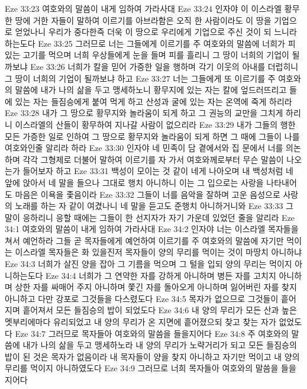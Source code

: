 Eze 33:23  여호와의 말씀이 내게 임하여 가라사대
Eze 33:24  인자야 이 이스라엘 황무한 땅에 거한 자들이 말하여 이르기를 아브라함은 오직 한 사람이라도 이 땅을 기업으로 얻었나니 우리가 중다한즉 더욱 이 땅으로 우리에게 기업으로 주신 것이 되 느니라 하는도다
Eze 33:25  그러므로 너는 그들에게 이르기를 주 여호와의 말씀에 너희가 피있는 고기를 먹으며 너희 우상들에게 눈을 들며 피를 흘리니 그 땅이 너희의 기업이 될까보냐
Eze 33:26  너희가 칼을 믿어 가증한 일을 행하며 각기 이웃의 아내를 더럽히니 그 땅이 너희의 기업이 될까보냐 하고
Eze 33:27  너는 그들에게 또 이르기를 주 여호와의 말씀에 내가 나의 삶을 두고 맹세하노니 황무지에 있는 자는 칼에 엎드러뜨리고 들에 있는 자는 들짐승에게 붙여 먹게 하고 산성과 굴에 있는 자는 온역에 죽게 하리라
Eze 33:28  내가 그 땅으로 황무지와 놀라움이 되게 하고 그 권능의 교만을 그치게 하리니 이스라엘의 산들이 황무하여 지나갈 사람이 없으리라
Eze 33:29  내가 그들의 행한 모든 가증한 일로 인하여 그 땅으로 황무지와 놀라움이 되게 하면 그 때에 그들이 나를 여호와인줄 알리라 하라
Eze 33:30  인자야 네 민족이 담 곁에서와 집 문에서 너를 의논하며 각각 그형제로 더불어 말하여 이르기를 자 가서 여호와께로부터 무슨 말씀이 나오는가 들어보자 하고
Eze 33:31  백성이 모이는 것 같이 네게 나아오며 내 백성처럼 네 앞에 앉아서 네 말을 들으나 그대로 행치 아니하니 이는 그 입으로는 사랑을 나타내어도 마음은 이욕을 좇음이라
Eze 33:32  그들이 너를 음악을 잘하며 고운 음성으로 사랑의 노래를 하는 자 같이 여겼나니 네 말을 듣고도 준행치 아니하거니와
Eze 33:33  그 말이 응하리니 응할 때에는 그들이 한 선지자가 자기 가운데 있었던 줄을 알리라
Eze 34:1  여호와의 말씀이 내게 임하여 가라사대
Eze 34:2  인자야 너는 이스라엘 목자들을 쳐서 예언하라 그들 곧 목자들에게 예언하여 이르기를 주 여호와의 말씀에 자기만 먹이는 이스라엘 목자들은 화 있을진저 목자들이 양의 무리를 먹이는 것이 마땅치 아니하냐
Eze 34:3  너희가 살진 양을 잡아 그 기름을 먹으며 그 털을 입되 양의 무리는 먹이지 아니하는도다
Eze 34:4  너희가 그 연약한 자를 강하게 아니하며 병든 자를 고치지 아니하며 상한 자를 싸매어 주지 아니하며 쫓긴 자를 돌아오게 아니하며 잃어버린 자를 찾지 아니하고 다만 강포로 그것들을 다스렸도다
Eze 34:5  목자가 없으므로 그것들이 흩어지며 흩어져서 모든 들짐승의 밥이 되었도다
Eze 34:6  내 양의 무리가 모든 산과 높은 멧부리에마다 유리되었고 내 양의 무리가 온 지면에 흩어졌으되 찾고 찾는 자가 없었도다
Eze 34:7  그러므로 목자들아 여호와의 말씀을 들을지어다
Eze 34:8  주 여호와의 말씀에 내가 나의 삶을 두고 맹세하노라 내 양의 무리가 노략거리가 되고 모든 들짐승의 밥이 된 것은 목자가 없음이라 내 목자들이 양을 찾지 아니하고 자기만 먹이고 내 양의 무리를 먹이지 아니하였도다
Eze 34:9  그러므로 너희 목자들아 여호와의 말씀을 들을지어다
